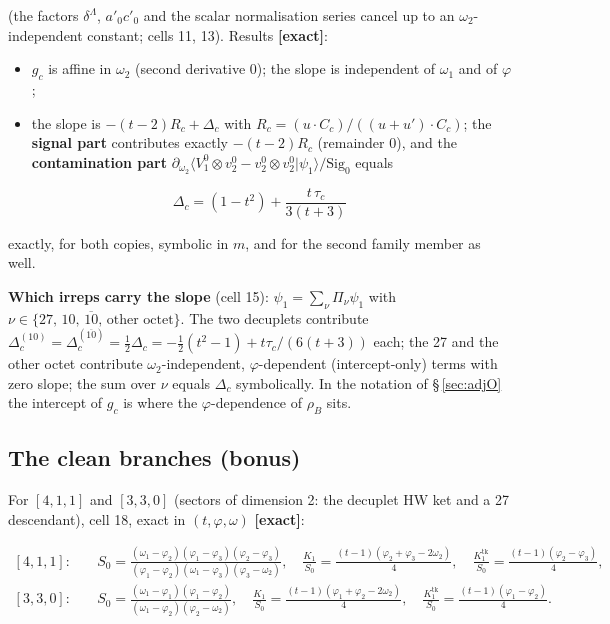 \documentclass[10pt]{article}
\begin{document}
(the factors $\delta^\Lambda$, $a'_0c'_0$ and the scalar normalisation series cancel up to an $\omega_2$-independent constant; cells 11, 13). Results \textbf{[exact]}:

\begin{itemize}\setlength{\itemsep}{1pt}
\item $g_c$ is affine in $\omega_2$ (second derivative 0); the slope is independent of $\omega_1$ and of $\varphi$;
\item the slope is $-(t-2)R_c+\Delta_c$ with $R_c=(u\cdot C_c)/((u+u')\cdot C_c)$; the \textbf{signal part} contributes exactly $-(t-2)R_c$ (remainder 0), and the \textbf{contamination part} $\partial_{\omega_2}\langle V_1^0\otimes v_2^0-v_2^0\otimes v_2^0|\psi_1\rangle/\mathrm{Sig}_0$ equals
\end{itemize}

\[
\Delta_c=(1-t^2)+\frac{t\,\tau_c}{3(t+3)}
\]

exactly, for both copies, symbolic in $m$, and for the second family member as well.

\textbf{Which irreps carry the slope} (cell 15): $\psi_1=\sum_\nu\Pi_\nu\psi_1$ with $\nu\in\{27,\,10,\,\overline{10},\,\text{other octet}\}$. The two decuplets contribute $\Delta_c^{(10)}=\Delta_c^{(\overline{10})}=\tfrac12\Delta_c=-\tfrac12(t^2-1)+t\tau_c/(6(t+3))$ each; the 27 and the other octet contribute $\omega_2$-independent, $\varphi$-dependent (intercept-only) terms with zero slope; the sum over $\nu$ equals $\Delta_c$ symbolically. In the notation of \S\,\ref{sec:adjO} the intercept of $g_c$ is where the $\varphi$-dependence of $\rho_B$ sits.

\subsection{The clean branches (bonus)}\label{sec:pertclean}

For $[4,1,1]$ and $[3,3,0]$ (sectors of dimension 2: the decuplet HW ket and a 27 descendant), cell 18, exact in $(t,\varphi,\omega)$ \textbf{[exact]}:

\[
\begin{aligned}
[4,1,1]:\quad &S_0=\frac{(\omega_1-\varphi_2)(\varphi_1-\varphi_3)(\varphi_2-\varphi_3)}{(\varphi_1-\varphi_2)(\omega_1-\varphi_3)(\varphi_3-\omega_2)},\quad \frac{K_1}{S_0}=\frac{(t-1)(\varphi_2+\varphi_3-2\omega_2)}{4},\quad \frac{K_1^{\mathrm{tk}}}{S_0}=\frac{(t-1)(\varphi_2-\varphi_3)}{4},\\
[3,3,0]:\quad &S_0=\frac{(\omega_1-\varphi_1)(\varphi_1-\varphi_2)}{(\omega_1-\varphi_2)(\varphi_2-\omega_2)},\quad \frac{K_1}{S_0}=\frac{(t-1)(\varphi_1+\varphi_2-2\omega_2)}{4},\quad \frac{K_1^{\mathrm{tk}}}{S_0}=\frac{(t-1)(\varphi_1-\varphi_2)}{4}.
\end{aligned}
\]
\end{document}
